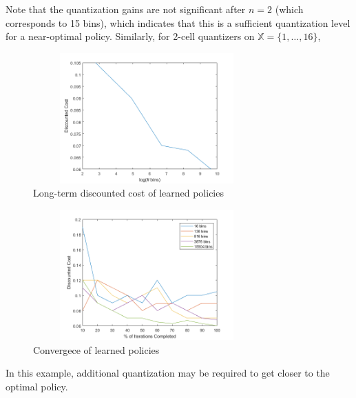 \documentclass[conference]{IEEEtran}
\begin{document}
Note that the quantization gains are not significant after \( n=2 \) (which corresponds to 15 bins), which indicates that this is a sufficient quantization level for a near-optimal policy.
\newpage
Similarly, for 2-cell quantizers on \( \mathbb{X} = \{1,\ldots,16\} \),
\vspace{-1em}
\begin{figure}[H]
    \centering
    \includegraphics[height=5cm, width=8.75cm]{cost_16.png}
    \caption{Long-term discounted cost of learned policies}
\end{figure}
\vspace{-1em}
\begin{figure}[H]
    \centering
    \includegraphics[height=5cm, width=8.75cm]{convergence_16.png}
    \caption{Convergece of learned policies}
\end{figure}

In this example, additional quantization may be required to get closer to the optimal policy.
\end{document}
